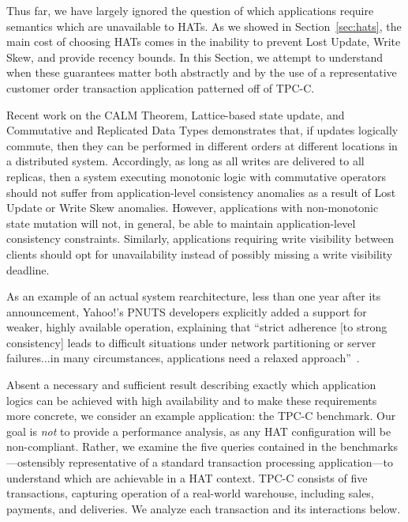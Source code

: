 Thus far, we have largely ignored the question of which applications
require semantics which are unavailable to HATs. As we showed in
Section~\ref{sec:hats}, the main cost of choosing HATs comes in the
inability to prevent Lost Update, Write Skew, and provide recency
bounds. In this Section, we attempt to understand when these
guarantees matter both abstractly and by the use of a representative
customer order transaction application patterned off of TPC-C.

Recent work on the CALM Theorem, Lattice-based state update, and
Commutative and Replicated Data Types demonstrates that, if updates
logically commute, then they can be performed in different orders at
different locations in a distributed system. Accordingly, as long as
all writes are delivered to all replicas, then a system executing
monotonic logic with commutative operators should not suffer from
application-level consistency anomalies as a result of Lost Update or
Write Skew anomalies. However, applications with non-monotonic state
mutation will not, in general, be able to maintain application-level
consistency constraints. Similarly, applications requiring
write visibility between clients should opt for unavailability instead
of possibly missing a write visibility deadline.

As an example of an actual system rearchitecture,
less than one year after its announcement, Yahoo!'s PNUTS developers
explicitly added a support for weaker, highly available operation,
explaining that ``strict adherence [to strong consistency] leads to
difficult situations under network partitioning or server
failures...in many circumstances, applications need a relaxed
approach''~\cite{pnuts-update}.

Absent a necessary and sufficient result describing exactly which
application logics can be achieved with high availability and to make
these requirements more concrete, we consider an example application:
the TPC-C benchmark. Our goal is \textit{not} to provide a performance
analysis, as any HAT configuration will be non-compliant. Rather, we
examine the five queries contained in the benchmarks---ostensibly
representative of a standard transaction processing application---to
understand which are achievable in a HAT context. TPC-C consists of
five transactions, capturing operation of a real-world warehouse,
including sales, payments, and deliveries. We analyze each transaction
and its interactions below.

